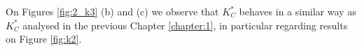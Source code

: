 On Figures \ref{fig:2_k3} (b) and (c) we observe that $K^*_C$ behaves in a similar way as $K^*_C$ analysed in the previous Chapter \ref{chapter:1}, in particular regarding results on Figure \ref{fig:k2}.



